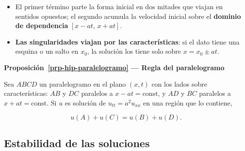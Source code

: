 \documentclass[
  spanish,
  a4paper,
]{scrbook}
\providecommand{\tightlist}{%
  \setlength{\itemsep}{0pt}\setlength{\parskip}{0pt}}
\theoremstyle{definition}
\theoremstyle{plain}
\theoremstyle{definition}
\theoremstyle{plain}
\theoremstyle{definition}
\theoremstyle{remark}
\begin{document}
\begin{itemize}
\tightlist
\item
  El primer término parte la forma inicial en dos mitades que viajan en
  sentidos opuestos; el segundo acumula la velocidad inicial sobre el
  \textbf{dominio de dependencia} \([x-at,\,x+at]\).
\item
  \textbf{Las singularidades viajan por las características}: si el dato
  tiene una esquina o un salto en \(x_0\), la solución los tiene solo
  sobre \(x = x_0\pm at\).
\end{itemize}

\begin{tcolorbox}[enhanced jigsaw, arc=.35mm, bottomrule=.15mm, breakable, colback=white, colframe=quarto-callout-note-color-frame, left=2mm, leftrule=.75mm, opacityback=0, rightrule=.15mm, toprule=.15mm]
\begin{minipage}[t]{5.5mm}
\textcolor{quarto-callout-note-color}{\faInfo}
\end{minipage}%
\begin{minipage}[t]{\textwidth - 5.5mm}

\vspace{-3mm}\textbf{Proposición~\ref{prp-hip-paralelogramo} --- Regla del paralelogramo}\vspace{3mm}

Sea \(ABCD\) un paralelogramo en el plano \((x,t)\) con los lados sobre
características: \(AB\) y \(DC\) paralelos a \(x-at=\text{const}\), y
\(AD\) y \(BC\) paralelos a \(x+at=\text{const}\). Si \(u\) es solución
de \(u_{tt}=a^2u_{xx}\) en una región que lo contiene,

\[
u(A) + u(C) = u(B) + u(D) .
\]

\end{minipage}%
\end{tcolorbox}

\subsection{Estabilidad de las soluciones}\label{sec-hip-resumen-3}
\end{document}
